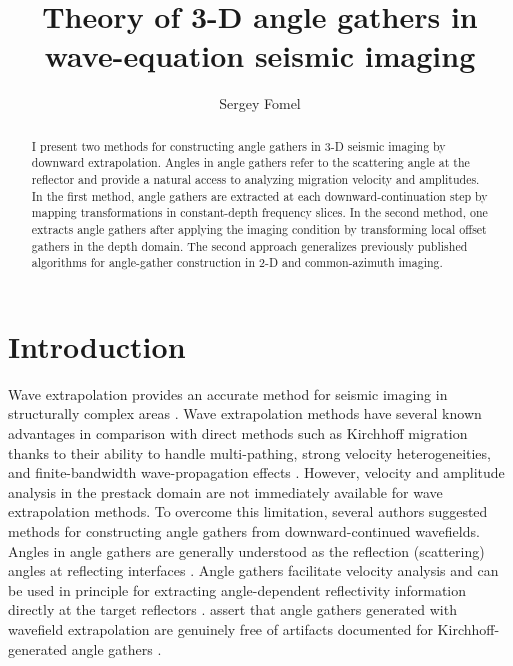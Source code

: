 \title{Theory of 3-D angle gathers in wave-equation seismic imaging}
\author{Sergey Fomel}


\maketitle

\begin{abstract}
  I present two methods for constructing angle gathers in 3-D seismic imaging
  by downward extrapolation. Angles in angle gathers refer to the scattering
  angle at the reflector and provide a natural access to analyzing migration
  velocity and amplitudes. In the first method, angle gathers are extracted at
  each downward-continuation step by mapping transformations in constant-depth
  frequency slices. In the second method, one extracts angle gathers after
  applying the imaging condition by transforming local offset gathers in the
  depth domain.  The second approach generalizes previously published
  algorithms for angle-gather construction in 2-D and common-azimuth imaging. 
\end{abstract}

\section{Introduction}

Wave extrapolation provides an accurate method for seismic imaging in
structurally complex areas \cite[]{biondi,etgen}. Wave
extrapolation methods have several known advantages in comparison with
direct methods such as Kirchhoff migration thanks to their ability to
handle multi-pathing, strong velocity heterogeneities, and
finite-bandwidth wave-propagation effects
\cite[]{GEO66-05-16221640}.  However, velocity and amplitude analysis in the
prestack domain are not immediately available for wave extrapolation
methods. To overcome this limitation, several authors
\cite[]{GEO55-09-12231234,SEG-1999-08240827,SEG-2000-08300833,GEO67-03-08830889,wu,SEG-2003-08890892,GEO68-03-10651074,cig,tsic}
suggested methods for constructing angle gathers from downward-continued
wavefields. Angles in angle gathers are generally understood as the reflection
(scattering) angles at reflecting interfaces \cite[]{xu,hoop}. Angle gathers
facilitate velocity analysis \cite[]{SEG-2001-08850888,stork} and can be used in
principle for extracting angle-dependent reflectivity information directly at
the target reflectors \cite[]{SEG-2001-02960299}. \cite{stolk} assert that
angle gathers generated with wavefield extrapolation are genuinely free of
artifacts documented for Kirchhoff-generated angle gathers \cite[]{symes,symes2}.

